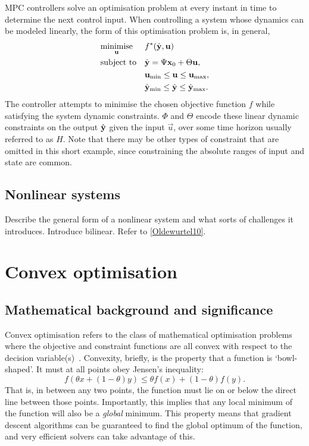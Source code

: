 MPC controllers solve an optimisation problem at every instant in time to determine the next control input.
When controlling a system whose dynamics can be modeled linearly, the form of this optimisation problem is, in general,
\begin{equation}
   \label{eq:mpc-opt}
   \begin{aligned}
      & \underset{\mathbf{u}}{\text{minimise}}
      & & f^*(\hat{\mathbf{y}}, \mathbf{u}) \\
      & \text{subject to}
      & & \hat{\mathbf{y}} = \Psi \mathbf{x}_0 + \Theta \mathbf{u}, \\
      &&& \mathbf{u}_{\text{min}} \le \mathbf{u} \le \mathbf{u}_{\text{max}}, \\
      &&& \hat{\mathbf{y}}_{\text{min}} \le \hat{\mathbf{y}} \le \hat{\mathbf{y}}_{\text{max}}.
   \end{aligned}
\end{equation}
The controller attempts to minimise the chosen objective function $f$ while satisfying the system dynamic constraints.
$\Phi$ and $\Theta$ encode these linear dynamic constraints on the output $\hat{\mathbf{y}}$ given the input $\vec{u}$, over some time horizon usually referred to as $H$.
Note that there may be other types of constraint that are omitted in this short example, since constraining the absolute ranges of input and state are common.

\subsection{Nonlinear systems}


Describe the general form of a nonlinear system and what sorts of challenges it introduces.
Introduce bilinear.
Refer to \ref{Oldewurtel10}.

\section{Convex optimisation}
\label{sec:background:convex}

\subsection{Mathematical background and significance}

Convex optimisation refers to the class of mathematical optimisation problems where the objective and constraint functions are all convex with respect to the decision variable(s)~\cite{Boyd04}.
Convexity, briefly, is the property that a function is `bowl-shaped'.
It must at all points obey Jensen's inequality:
\begin{equation}
   f(\theta x + (1-\theta)y) \le \theta f(x) + (1-\theta) f(y).
\end{equation}
That is, in between any two points, the function must lie on or below the direct line between those points.
Importantly, this implies that any local minimum of the function will also be a \emph{global} minimum.
This property means that gradient descent algorithms can be guaranteed to find the global optimum of the function, and very efficient solvers can take advantage of this.

